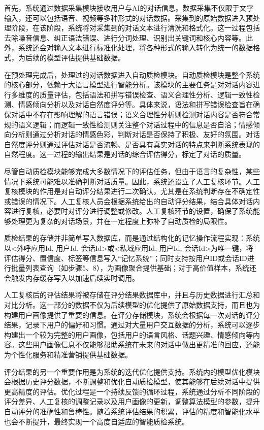 首先，系统通过数据采集模块接收用户与AI的对话信息。数据采集不仅限于文字输入，还可以包括语音、视频等多种形式的对话数据。采集到的原始数据进入预处理阶段，在该阶段，系统将对采集到的对话文本进行清洗和格式化。这一过程包括去除噪音信息、纠正语法错误、进行分词处理、识别出关键词和核心内容等。此外，系统还会对输入文本进行标准化处理，将各种形式的输入转化为统一的数据格式，为后续的模型评估提供基础数据。

在预处理完成后，处理过的对话数据进入自动质检模块。自动质检模块是整个系统的核心部分，依赖于大语言模型进行智能分析。该模块的主要任务是对对话内容进行多维度的质量评估，包括语法和拼写错误检查、语义合理性分析、逻辑一致性检测、情感倾向分析以及对话自然度评分等。具体来说，语法和拼写错误检查旨在确保对话中不存在影响理解的语言错误；语义合理性分析则检测对话内容是否符合常规的语义逻辑；而逻辑一致性检测则关注整个对话过程中的信息是否自洽；情感倾向分析则通过分析对话的情感色彩，判断对话是否保持了积极、友好的氛围。对话自然度评分则通过评估对话是否流畅、是否具有真实对话的特点来判断系统表现的自然程度。这一过程的输出结果是对话的综合评估得分，标定了对话的质量。

尽管自动质检模块能够完成大多数情况下的评估任务，但由于语言的复杂性，某些情况下系统可能难以准确判断对话质量。因此，系统还设立了人工复核环节。人工复核模块的作用是对自动评分结果进行二次确认，尤其是在系统判断存在不确定性或错误的情况下。人工复核人员会根据系统给出的自动评分结果，结合具体对话内容进行复核，必要时对评分进行调整或修改。人工复核环节的设置，确保了系统能够处理更为复杂的对话场景，并在一定程度上弥补了自动质检的局限性。

质检结果的存储并非简单写入数据库，而是通过结构化的记忆操作流程实现：系统以<外呼应用Id, 用户Id, 会话Id>或<私域应用Id, 用户Id, 会话Id>为唯一键，将评估得分、置信度、标签等信息写入“记忆系统”；同时支持按用户ID或会话ID进行批量列表查询（如步骤5、8），为画像聚合提供基础；对于高价值样本，系统还会触发内存缓存写入以加速后续实时调用。


人工复核后的评估结果将被存储在评分结果数据库中，并且与历史数据进行汇总和对比分析。这一部分的数据不仅为后续模型的优化提供了原始数据支持，而且也为构建用户画像提供了重要的信息。在评分存储模块，系统会根据每一次对话的评分结果，记录下用户的偏好和习惯。通过对大量用户交互数据的分析，系统可以逐步构建出一个较为完整的用户画像，包括用户的语言风格、话题兴趣、情感倾向等内容。这些用户画像信息不仅能够帮助系统在未来的对话中做出更精准的回应，还能为个性化服务和精准营销提供基础数据。

评分结果的另一个重要作用是为系统的迭代优化提供支持。系统内的模型优化模块会根据历史评分数据，不断调整和优化自动质检模型，使其能够在后续对话中提供更高精度的评估。优化过程是一个持续反馈的循环过程，系统通过分析不同阶段的评分差异、人工复核的调整记录以及用户画像的更新，调整算法模型的参数，提升自动评分的准确性和鲁棒性。随着系统评估结果的积累，评估的精度和智能化水平也会不断提升，最终实现一个高度自适应的智能质检系统。

